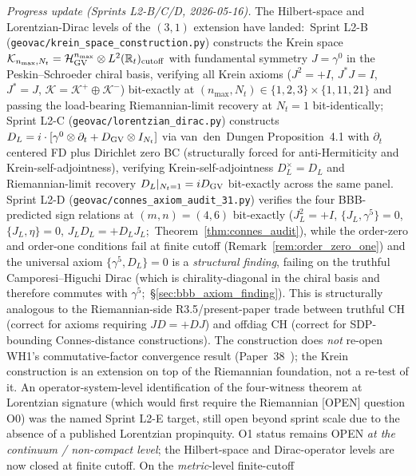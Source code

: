\documentclass[11pt,a4paper]{article}
\theoremstyle{plain}
\theoremstyle{definition}
\newcommand{\nmax}{n_{\max}}
\begin{document}
\emph{Progress update (Sprints L2-B/C/D, 2026-05-16).}
The Hilbert-space and Lorentzian-Dirac levels of the $(3, 1)$
extension have landed:\ Sprint L2-B
(\texttt{geovac/krein\_space\_construction.py}) constructs the
Krein space $\mathcal{K}_{\nmax, N_t} = \mathcal{H}_{\rm GV}^{\nmax}
\otimes L^2(\mathbb{R}_t)_{\rm cutoff}$ with fundamental symmetry
$J = \gamma^0$ in the Peskin--Schroeder chiral basis, verifying all
Krein axioms ($J^2 = +I$, $J^* J = I$, $J^* = J$,
$\mathcal{K} = \mathcal{K}^+ \oplus \mathcal{K}^-$) bit-exactly at
$(\nmax, N_t) \in \{1, 2, 3\} \times \{1, 11, 21\}$ and passing the
load-bearing Riemannian-limit recovery at $N_t = 1$ bit-identically;
Sprint L2-C (\texttt{geovac/lorentzian\_dirac.py}) constructs
$D_L = i \cdot [\gamma^0 \otimes \partial_t + D_{\rm GV} \otimes I_{N_t}]$
via van~den~Dungen Proposition~4.1 with $\partial_t$ centered FD plus
Dirichlet zero BC (structurally forced for anti-Hermiticity and
Krein-self-adjointness), verifying Krein-self-adjointness
$D_L^\times = D_L$ and Riemannian-limit recovery $D_L|_{N_t = 1} =
i D_{\rm GV}$ bit-exactly across the same panel.  Sprint L2-D
(\texttt{geovac/connes\_axiom\_audit\_31.py}) verifies the four
BBB-predicted sign relations at $(m, n) = (4, 6)$ bit-exactly
($J_L^2 = +I$, $\{J_L, \gamma^5\} = 0$, $\{J_L, \eta\} = 0$,
$J_L D_L = +D_L J_L$;\ Theorem~\ref{thm:connes_audit}), while the
order-zero and order-one conditions fail at finite cutoff
(Remark~\ref{rem:order_zero_one}) and the universal axiom
$\{\gamma^5, D_L\} = 0$ is a
\emph{structural finding}, failing on the truthful Camporesi--Higuchi
Dirac (which is chirality-diagonal in the chiral basis and therefore
commutes with $\gamma^5$;\ \S\ref{sec:bbb_axiom_finding}).  This is structurally
analogous to the Riemannian-side R3.5/present-paper trade between
truthful CH (correct for axioms requiring $JD = +DJ$) and offdiag CH
(correct for SDP-bounding Connes-distance constructions).  The
construction does \emph{not} re-open WH1's commutative-factor convergence result
(Paper~38~\cite{paper38}); the Krein construction is an extension on
top of the Riemannian foundation, not a re-test of it.  An
operator-system-level identification of the four-witness theorem at
Lorentzian signature (which would first require the Riemannian [OPEN]
question O0) was the named Sprint L2-E target, still open beyond
sprint scale due to the absence of a published Lorentzian
propinquity.  O1 status remains OPEN \emph{at the continuum /
non-compact level}; the Hilbert-space and Dirac-operator levels are now
closed at finite cutoff.  On the \emph{metric}-level finite-cutoff
\end{document}
